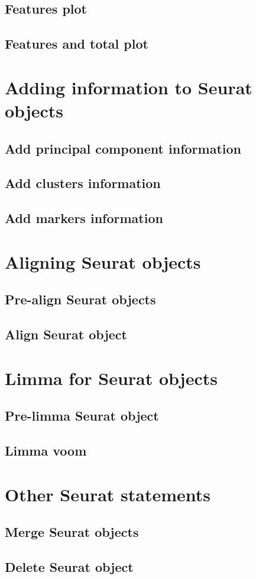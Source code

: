 \subsection{Features plot}
\subsection{Features and total plot}

\section{Adding information to Seurat objects}
\subsection{Add principal component information}
\subsection{Add clusters information}
\subsection{Add markers information}

\section{Aligning Seurat objects}
\subsection{Pre-align Seurat objects}
\subsection{Align Seurat object}

\section{Limma for Seurat objects}\label{sec:LimmaSeurat}
\subsection{Pre-limma Seurat object}
\subsection{Limma voom}

\section{Other Seurat statements}\label{sec:OtherSeuratStatements}
\subsection{Merge Seurat objects}
\subsection{Delete Seurat object}

